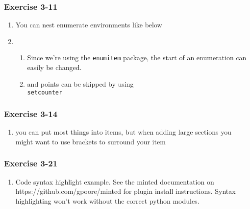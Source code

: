 \documentclass[a4paper]{article}
\newcommand{\ex}[1]{\subsubsection*{#1}}
\begin{document}
\pagestyle{fancy} %



\ex{Exercise 3-11}

\begin{enumerate}[label=\alph*)]
  \item You can nest enumerate environments like below
  \item
    \begin{enumerate}[start = 2, label=\arabic*)]
      \item Since we're using the \texttt{enumitem} package, the start of an
        enumeration can easily be changed.
        \setcounter{enumii}{4} %
      \item and points can be skipped by using \texttt{\\setcounter}
    \end{enumerate}
\end{enumerate}



\ex{Exercise 3-14}

\begin{enumerate}[label=\Alph*)] %
  \item you can put most things into items, but when adding large sections you
    might want to use brackets to surround your item
\end{enumerate}



\ex{Exercise 3-21}

\begin{enumerate}
    \item{
            Code syntax highlight example. See the minted documentation on
            https://github.com/gpoore/minted for plugin install instructions.
            Syntax highlighting won't work without the correct python modules.

%
%
%


    }

\end{enumerate}
\end{document}
